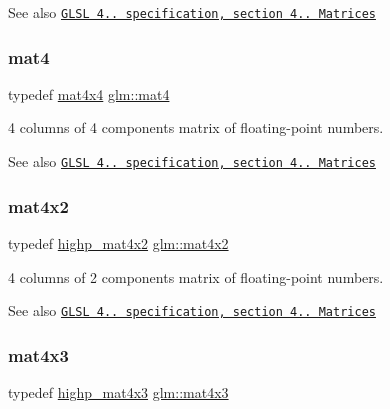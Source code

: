 \begin{DoxySeeAlso}{See also}
\href{http://www.opengl.org/registry/doc/GLSLangSpec.4.20.8.pdf}{\tt G\+L\+SL 4.. specification, section 4.. Matrices} 
\end{DoxySeeAlso}
\mbox{\label{group__core__types_ga7dcd2365c2e368e6af5b7adeb6a9c8df}} 
\subsubsection{\texorpdfstring{mat4}{mat4}}
{\footnotesize\ttfamily typedef \hyperlink{group__core__types_ga63e3ee9447ed593484140a9368e738ec}{mat4x4} \hyperlink{group__core__types_ga7dcd2365c2e368e6af5b7adeb6a9c8df}{glm\+::mat4}}

4 columns of 4 components matrix of floating-\/point numbers.

\begin{DoxySeeAlso}{See also}
\href{http://www.opengl.org/registry/doc/GLSLangSpec.4.20.8.pdf}{\tt G\+L\+SL 4.. specification, section 4.. Matrices} 
\end{DoxySeeAlso}
\mbox{\label{group__core__types_ga72cf8ec4f4cda85943f4683531e421bc}} 
\subsubsection{\texorpdfstring{mat4x2}{mat4x2}}
{\footnotesize\ttfamily typedef \hyperlink{group__core__precision_ga0355949c79024224f7e9cfa06bc82153}{highp\+\_\+mat4x2} \hyperlink{group__core__types_ga72cf8ec4f4cda85943f4683531e421bc}{glm\+::mat4x2}}

4 columns of 2 components matrix of floating-\/point numbers.

\begin{DoxySeeAlso}{See also}
\href{http://www.opengl.org/registry/doc/GLSLangSpec.4.20.8.pdf}{\tt G\+L\+SL 4.. specification, section 4.. Matrices} 
\end{DoxySeeAlso}
\mbox{\label{group__core__types_gad3f3f750dcdc74a9037342c5cae55f5e}} 
\subsubsection{\texorpdfstring{mat4x3}{mat4x3}}
{\footnotesize\ttfamily typedef \hyperlink{group__core__precision_ga20620a62fd7d4e020e772c4d258cf2e4}{highp\+\_\+mat4x3} \hyperlink{group__core__types_gad3f3f750dcdc74a9037342c5cae55f5e}{glm\+::mat4x3}}

